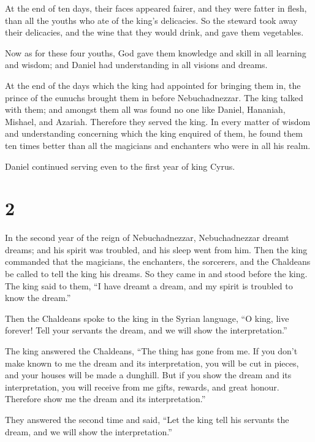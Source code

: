  At the end of ten days, their faces appeared fairer, and
they were fatter in flesh, than all the youths who ate of the king's
delicacies.  So the steward took away their delicacies, and
the wine that they would drink, and gave them vegetables.

 Now as for these four youths, God gave them knowledge and
skill in all learning and wisdom; and Daniel had understanding in all
visions and dreams.

 At the end of the days which the king had appointed for
bringing them in, the prince of the eunuchs brought them in before
Nebuchadnezzar.  The king talked with them; and amongst
them all was found no one like Daniel, Hananiah, Mishael, and Azariah.
Therefore they served the king.  In every matter of wisdom
and understanding concerning which the king enquired of them, he found
them ten times better than all the magicians and enchanters who were in
all his realm.

 Daniel continued serving even to the first year of king
Cyrus.

\hypertarget{section-1}{%
\section{2}\label{section-1}}

 In the second year of the reign of Nebuchadnezzar,
Nebuchadnezzar dreamt dreams; and his spirit was troubled, and his sleep
went from him.  Then the king commanded that the magicians,
the enchanters, the sorcerers, and the Chaldeans be called to tell the
king his dreams. So they came in and stood before the king. 
The king said to them, ``I have dreamt a dream, and my spirit is
troubled to know the dream.''

 Then the Chaldeans spoke to the king in the Syrian
language, ``O king, live forever! Tell your servants the dream, and we
will show the interpretation.''

 The king answered the Chaldeans, ``The thing has gone from
me. If you don't make known to me the dream and its interpretation, you
will be cut in pieces, and your houses will be made a dunghill.
 But if you show the dream and its interpretation, you will
receive from me gifts, rewards, and great honour. Therefore show me the
dream and its interpretation.''

 They answered the second time and said, ``Let the king tell
his servants the dream, and we will show the interpretation.''

